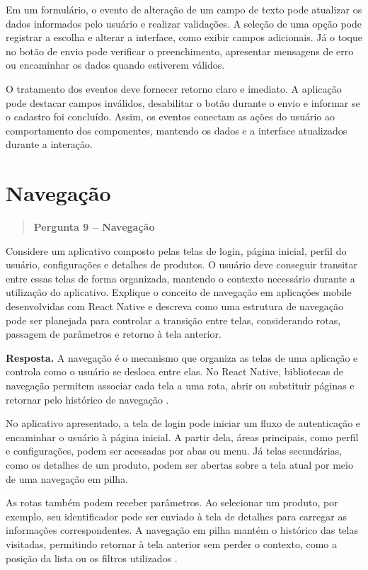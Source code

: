 \documentclass[
    12pt,
    oneside,
    a4paper,
    brazil
]{abntex2}
\newcommand{\pergunta}[2]{%
\begin{quote}
\noindent\textbf{Pergunta #1 -- #2}
\end{quote}}
\newcommand{\resposta}{%
\par\noindent\textbf{Resposta.}\hspace{0.3em}
}
\begin{document}
Em um formulário, o evento de alteração de um campo de texto pode atualizar os dados informados pelo usuário e realizar validações. A seleção de uma opção pode registrar a escolha e alterar a interface, como exibir campos adicionais. Já o toque no botão de envio pode verificar o preenchimento, apresentar mensagens de erro ou encaminhar os dados quando estiverem válidos.

O tratamento dos eventos deve fornecer retorno claro e imediato. A aplicação pode destacar campos inválidos, desabilitar o botão durante o envio e informar se o cadastro foi concluído. Assim, os eventos conectam as ações do usuário ao comportamento dos componentes, mantendo os dados e a interface atualizados durante a interação.


\section{Navegação}
\pergunta{9}{Navegação}

Considere um aplicativo composto pelas telas de login, página inicial, perfil do usuário, configurações e detalhes de produtos. O usuário deve conseguir transitar entre essas telas de forma organizada, mantendo o contexto necessário durante a utilização do aplicativo. Explique o conceito de navegação em aplicações mobile desenvolvidas com React Native e descreva como uma estrutura de navegação pode ser planejada para controlar a transição entre telas, considerando rotas, passagem de parâmetros e retorno à tela anterior.

\resposta A navegação é o mecanismo que organiza as telas de uma aplicação e controla como o usuário se desloca entre elas. No React Native, bibliotecas de navegação permitem associar cada tela a uma rota, abrir ou substituir páginas e retornar pelo histórico de navegação \cite{reactNavigation}.

No aplicativo apresentado, a tela de login pode iniciar um fluxo de autenticação e encaminhar o usuário à página inicial. A partir dela, áreas principais, como perfil e configurações, podem ser acessadas por abas ou menu. Já telas secundárias, como os detalhes de um produto, podem ser abertas sobre a tela atual por meio de uma navegação em pilha.

As rotas também podem receber parâmetros. Ao selecionar um produto, por exemplo, seu identificador pode ser enviado à tela de detalhes para carregar as informações correspondentes. A navegação em pilha mantém o histórico das telas visitadas, permitindo retornar à tela anterior sem perder o contexto, como a posição da lista ou os filtros utilizados \cite{reactNavigationParams}.
\end{document}

